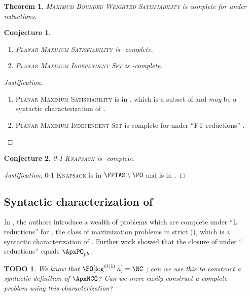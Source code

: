 \documentclass[]{article}
\theoremstyle{plain}
\newtheorem{conjecture}{Conjecture}
\newtheorem{theorem}{Theorem}
\newtheorem{todo}{TODO}
\theoremstyle{definition}
\newenvironment{justification}{\begin{proof}[Justification]}{\end{proof}}
\begin{document}
\begin{theorem}
  \textsc{Maximum Bounded Weighted Satisfiability} is complete for \ApxNCO{} under \NCAS{} reductions.
\end{theorem}

\begin{conjecture}
  \mbox{}
  \begin{enumerate}
  \item \textsc{Planar Maximum Satisfiability} is \NCAS-complete.
  \item \textsc{Planar Maximum Independent Set} is \NCAS-complete.
  \end{enumerate}
\end{conjecture}
\begin{justification}
  \mbox{}
  \begin{enumerate}
  \item \textsc{Planar Maximum Satisfiability} is in \PMPSAT, which is a subset of \PTAS{} and \emph{may} be a syntactic characterization of \PTAS{} \cite{km96}.
  \item \textsc{Planar Maximum Independent Set} is complete for \PTAS{} under ``FT reductions'' \cite[Theorem~6]{bep06}.
  \end{enumerate}
\end{justification}

\begin{conjecture}
  \textsc{0-1 Knapsack} is \FNCAS-complete.
\end{conjecture}
\begin{justification}
  \textsc{0-1 Knapsack} is in $\FPTAS\setminus\PO$ \cite[Section~3.2]{ep10} and is in \FNCAS{} \cite[Theorem~2]{mayr88}.
\end{justification}

\subsection{Syntactic characterization of \texorpdfstring{\ApxNCO}{ApxNCO}}

In \cite{py91}, the authors introduce a wealth of problems which are complete under ``L reductions'' for \MaxSNP, the class of maximization problems in strict \NP{} (\SNP), which is a syntactic characterization of \NP.
Further work showed that the closure of \MaxSNP{} under ``\PTAS{} reductions'' equals $\ApxPO_{pb}$ \cite{kmsv99}.

\begin{todo}
  We know that $\FO[\log^{O(1)} n] = \NC$ \cite[Theorem~5.2]{immerman99}; can we use this to construct a syntactic definition of $\ApxNCO$?
  Can we more easily construct a complete problem using this characterization?
\end{todo}
\end{document}
